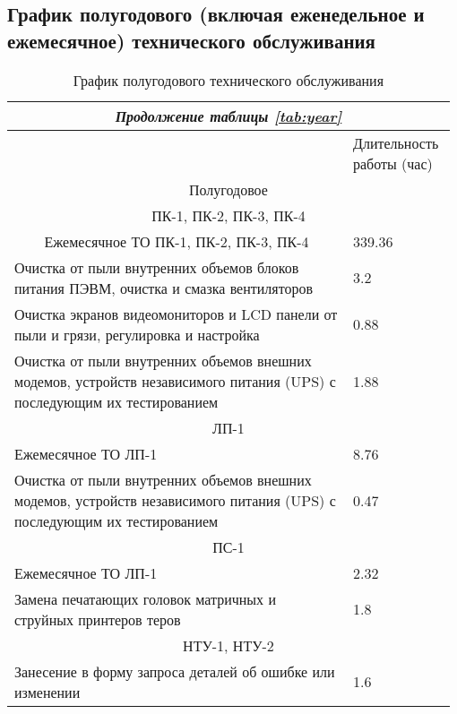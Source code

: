 \documentclass[a4paper,14pt]{extarticle}
\begin{document}
\subsection*{График полугодового (включая еженедельное и ежемесячное) технического обслуживания}
\small
\begin{longtable}{|p{0.75\linewidth}|m{0.23\linewidth}|}

		\caption{График полугодового технического обслуживания}
\endfirsthead

\multicolumn{2}{c}{\textit{Продолжение таблицы \ref{tab:year}}}\\
\endhead

\hline
\endfoot


\endlastfoot
		\hline
		\multicolumn{1}{|c|}{Наименование работы} & Длительность работы (час) \\ \hline
		\multicolumn{ 2}{|c|}{Полугодовое} \\ \hline
		\multicolumn{ 2}{|c|}{ПК-1, ПК-2, ПК-3, ПК-4} \\ \hline
		\multicolumn{1}{|c|}{Ежемесячное ТО ПК-1, ПК-2, ПК-3, ПК-4} & 339.36 \\ \hline
		Очистка от пыли внутренних объемов 
		блоков питания ПЭВМ, очистка и 
		смазка вентиляторов  & 3.2 \\ \hline
		Очистка экранов видеомониторов и LCD 
		панели от пыли и грязи, регулировка 
		и настройка  & 0.88 \\ \hline
		Очистка от пыли внутренних объемов 
		внешних модемов, устройств 
		независимого питания (UPS) с 
		последующим их тестированием  & 1.88 \\ \hline
		\multicolumn{ 2}{|c|}{ЛП-1} \\ \hline
		Ежемесячное ТО ЛП-1 & 8.76 \\ \hline
		Очистка от пыли внутренних объемов внешних модемов, устройств независимого питания (UPS) с последующим их тестированием & 0.47 \\ \hline
		\multicolumn{ 2}{|c|}{ПС-1} \\ \hline
		Ежемесячное ТО ЛП-1 & 2.32 \\ \hline
		Замена печатающих головок матричных и струйных принтеров теров  & 1.8 \\ \hline
		\multicolumn{ 2}{|c|}{НТУ-1, НТУ-2} \\ \hline
		Занесение в форму запроса деталей об 
		ошибке или изменении   & 1.6 \\ \hline

\end{longtable}
\end{document}
